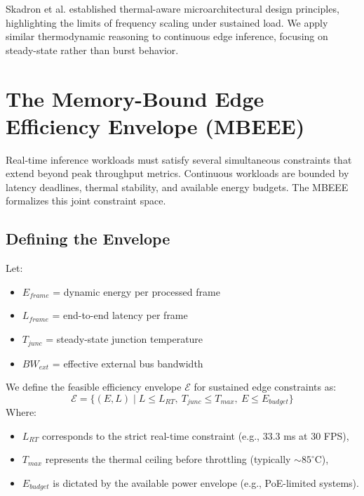 \documentclass[conference]{IEEEtran}
\begin{document}
Skadron et al. \cite{b_thermal} established thermal-aware microarchitectural design principles, highlighting the limits of frequency scaling under sustained load. We apply similar thermodynamic reasoning to continuous edge inference, focusing on steady-state rather than burst behavior.

\section{The Memory-Bound Edge Efficiency Envelope (MBEEE)}

Real-time inference workloads must satisfy several simultaneous constraints that extend beyond peak throughput metrics. Continuous workloads are bounded by latency deadlines, thermal stability, and available energy budgets. The MBEEE formalizes this joint constraint space.

\subsection{Defining the Envelope}
Let:
\begin{itemize}
    \item $E_{frame}$ = dynamic energy per processed frame
    \item $L_{frame}$ = end-to-end latency per frame
    \item $T_{junc}$ = steady-state junction temperature
    \item $BW_{ext}$ = effective external bus bandwidth
\end{itemize}

We define the feasible efficiency envelope $\mathcal{E}$ for sustained edge constraints as:
\begin{equation}
\mathcal{E} = \{ (E, L) \mid L \le L_{RT},\ T_{junc} \le T_{max},\ E \le E_{budget} \}
\end{equation}
Where:
\begin{itemize}
    \item $L_{RT}$ corresponds to the strict real-time constraint (e.g., $33.3$ ms at 30 FPS),
    \item $T_{max}$ represents the thermal ceiling before throttling (typically $\sim 85^\circ$C),
    \item $E_{budget}$ is dictated by the available power envelope (e.g., PoE-limited systems).
\end{itemize}
\end{document}
